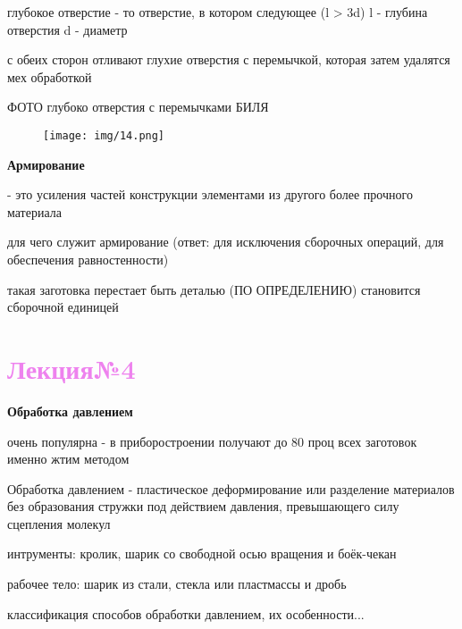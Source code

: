 {\begin{center}
    \par глубокое отверстие - то отверстие, в котором следующее (l > 3d) l - глубина отверстия d - диаметр

    \par с обеих сторон отливают глухие отверстия с перемычкой, которая затем удалятся мех обработкой 

    \par ФОТО глубоко отверстия с перемычками БИЛЯ
    \begin{figure}[H]
    \centering\texttt{[image: img/14.png]} 
    \end{figure}

    \par \textbf{Армирование}

    \par - это усиления частей конструкции элементами из другого более прочного материала 

    \par для чего служит армирование (ответ: для исключения сборочных операций, для обеспечения равностенности)

    \par такая заготовка перестает быть деталью (ПО ОПРЕДЕЛЕНИЮ) становится сборочной единицей
\end{center}
\newpage

\Large\section*{\textcolor{violet}{Лекция№4}}
\begin{center}

    \par \textbf{Обработка давлением}

    \par очень популярна - в приборостроении получают до 80 проц всех заготовок именно жтим методом

    \par Обработка давлением - пластическое деформирование или разделение материалов без образования стружки под действием давления, превышающего силу сцепления молекул 

    \par интрументы: кролик, шарик со свободной осью вращения и боёк-чекан

    \par рабочее тело: шарик из стали, стекла или пластмассы и дробь

    \par классификация способов обработки давлением, их особенности...


\end{center}}
